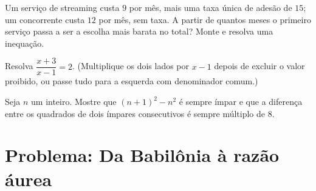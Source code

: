 \begin{exercise}[$\star\star$]\label{exo:g10:algebra:9}
Um serviço de streaming custa $9$ por mês, mais uma taxa única de
adesão de $15$; um concorrente custa $12$ por mês, sem taxa. A partir de
quantos meses o primeiro serviço passa a ser a escolha mais barata no
total? Monte e resolva uma inequação.
\end{exercise}

\begin{exercise}[$\star\star$]\label{exo:g10:algebra:10}
Resolva $\dfrac{x+3}{x-1} = 2$. (Multiplique os dois lados por $x - 1$
depois de excluir o valor proibido, ou passe tudo para a esquerda com
denominador comum.)
\end{exercise}

\begin{exercise}[$\star\star\star$]\label{exo:g10:algebra:11}
Seja $n$ um inteiro. Mostre que $(n + 1)^2 - n^2$ é sempre ímpar e que a
diferença entre os quadrados de dois ímpares consecutivos é sempre
múltiplo de $8$.
\end{exercise}

\section{Problema: Da Babilônia à razão áurea}

